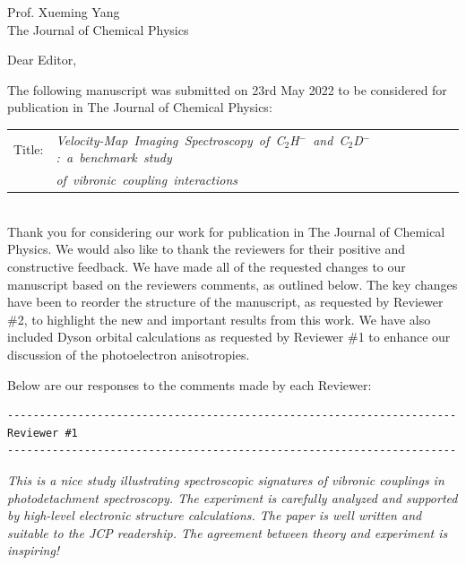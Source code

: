 \documentclass[a4paper,12pt]{letter}
\begin{document}
\begin{sf}
\begin{letter}{%
Prof. Xueming Yang\\
The Journal of Chemical Physics
}
\opening{Dear Editor,}
\thispagestyle{fancy}

The following manuscript was submitted on 23rd May 2022 to be considered for publication in
The Journal of Chemical Physics:

\begin{tabularx}{.95\textwidth}{ll}
	Title: & \hspace*{.4em}\mbox{\it Velocity-Map Imaging Spectroscopy of C$_2$H$^-$ and C$_2$D$^-$: a benchmark study} \\ & \hspace*{.4em}\mbox{\it of vibronic coupling interactions}\\
\end{tabularx}


\vspace*{-5ex}\ \\

Thank you for considering our work for publication in The Journal of Chemical Physics. We would also like to thank the reviewers for their positive and constructive feedback. We have made all of the requested changes to our manuscript based on the reviewers comments, as outlined below. The key changes have been to reorder the structure of the manuscript, as requested by Reviewer \#2, to highlight the new and important results from this work. We have also included Dyson orbital calculations as requested by Reviewer \#1 to enhance our discussion of the photoelectron anisotropies.

Below are our responses to the comments made by each Reviewer:  


\begin{verbatim}
----------------------------------------------------------------------
Reviewer #1  
----------------------------------------------------------------------
\end{verbatim}
\vspace*{-2ex}
\emph{This is a nice study illustrating spectroscopic signatures of vibronic couplings in photodetachment spectroscopy. The experiment is carefully analyzed and supported by high-level electronic structure calculations. The paper is well written and suitable to the JCP readership. The agreement between theory and experiment is inspiring!}


\end{letter}
\end{sf}
\end{document}
